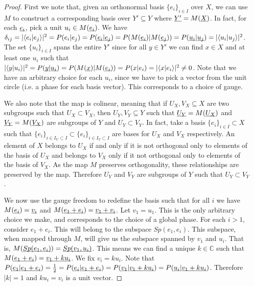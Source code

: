 \documentclass[aps,prl,amsmath,amssymb,twocolumn,nofootinbib]{revtex4}
\theoremstyle{plain}
\theoremstyle{definition}
\theoremstyle{remark}
\newcommand{\pj}[1] {\underbar{$#1$}}
\def\>{\rangle}
\def\<{\langle}
\begin{document}
\begin{proof}
  First we note that, given an orthonormal basis $\{e_i\}_{i \in I}$ over $X$, we can use $M$ to construct a corresponding basis over $Y' \subseteq Y$ where $\pj{Y'} = M(\pj{X})$. In fact, for each $\pj{e_i}$, pick a unit $u_i \in M(\pj{e_i})$. We have $\delta_{ij} = |\<e_i | e_j \>|^2 = P(e_i | e_j) = P(\pj{e_i}|\pj{e_j}) = P(M(\pj{e_i})|M(\pj{e_j})) = P(\pj{u_i}|\pj{u_j})= |\<u_i | u_j \>|^2$. The set $\{u_i\}_{i \in I}$ spans the entire $Y'$ since for all $y \in Y'$ we can find $x \in X$ and at least one $u_i$ such that $|\<y | u_i \>|^2 = P(\pj{y}|\pj{u_i}) = P(M(\pj{x})|M(\pj{e_i})) = P(x | e_i) = |\<x | e_i \>|^2 \neq 0$. Note that we have an arbitrary choice for each $u_i$, since we have to pick a vector from the unit circle (i.e. a phase for each basis vector). This corresponds to a choice of gauge.
  
  We also note that the map is colinear, meaning that if $U_X, V_X \subseteq X$ are two subgroups such that $U_X \subset V_X$, then $U_Y, V_Y \subseteq Y$ such that $\pj{U_Y} = M(\pj{U_X})$ and $\pj{V_Y} = M(\pj{V_X})$ are subgroups of $Y$ and $U_Y \subset V_Y$. In fact, take a basis $\{e_i\}_{i \in I} \subset X$ such that $\{e_i\}_{i \in I_U \subset I} \subset \{e_i\}_{i \in I_V \subset I}$ are bases for $U_X$ and $V_X$ respectively. An element of $X$ belongs to $U_X$ if and only if it is not orthogonal only to elements of the basis of $U_X$ and belongs to $V_X$ only if it not orthogonal only to elements of the basis of $V_X$. As the map $M$ preserves orthogonality, these relationships are preserved by the map. Therefore $U_Y$ and $V_Y$ are subgroups of $Y$ such that $U_Y \subset V_Y$.
  
  We now use the gauge freedom to redefine the basis such that for all $i$ we have $M(\pj{e_i}) = \pj{v_i}$ and $M(\pj{e_1 + e_i}) = \pj{v_1 + v_i}$. Let $v_1 = u_1$. This is the only arbitrary choice we make, and corresponds to the choice of a global phase. For each $i>1$, consider $e_1 + e_i$. This will belong to the subspace $Sp(e_1, e_i)$. This subspace, when mapped through $M$, will give us the subspace spanned by $v_1$ and $u_i$. That is, $M(\pj{Sp(e_1, e_i)})=\pj{Sp(v_1, u_i)}$. This means we can find a unique $k \in \mathbb{C}$ such that $M(\pj{e_1+e_i})=\pj{v_1+ku_i}$. We fix $v_i = k u_i$. Note that $P(\pj{e_1} | \pj{e_1+e_i}) = \frac{1}{2}=  P(\pj{e_i} | \pj{e_1+e_i})=P(\pj{v_1} | \pj{v_1+k u_i})=P(\pj{u_i} | \pj{v_1+k u_i})$. Therefore $|k| = 1$ and $k u_i = v_i$ is a unit vector.
  

\end{proof}
\end{document}
